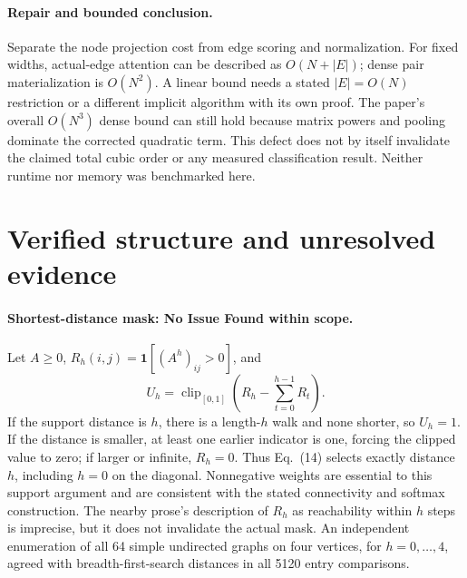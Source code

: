 \documentclass[10pt]{article}
\begin{document}
\paragraph*{Repair and bounded conclusion.}\mbox{}\par
Separate the node projection cost from edge scoring and normalization. For fixed widths, actual-edge attention can be described as \(O(N+|E|)\); dense pair materialization is \(O(N^2)\). A linear bound needs a stated \(|E|=O(N)\) restriction or a different implicit algorithm with its own proof. The paper’s overall \(O(N^3)\) dense bound can still hold because matrix powers and pooling dominate the corrected quadratic term. This defect does not by itself invalidate the claimed total cubic order or any measured classification result. Neither runtime nor memory was benchmarked here.\par
\section*{Verified structure and unresolved evidence}
\paragraph*{Shortest-distance mask: No Issue Found within scope.}\mbox{}\par
Let \(A\ge0\), \(R_h(i,j)=\mathbf1[(A^h)_{ij}>0]\), and \[U_h=\operatorname{clip}_{[0,1]}\left(R_h-\sum_{t=0}^{h-1}R_t\right).\] If the support distance is \(h\), there is a length-\(h\) walk and none shorter, so \(U_h=1\). If the distance is smaller, at least one earlier indicator is one, forcing the clipped value to zero; if larger or infinite, \(R_h=0\). Thus Eq. (14) selects exactly distance \(h\), including \(h=0\) on the diagonal. Nonnegative weights are essential to this support argument and are consistent with the stated connectivity and softmax construction. The nearby prose’s description of \(R_h\) as reachability within \(h\) steps is imprecise, but it does not invalidate the actual mask. An independent enumeration of all 64 simple undirected graphs on four vertices, for \(h=0,\ldots,4\), agreed with breadth-first-search distances in all 5120 entry comparisons.\par
\end{document}

